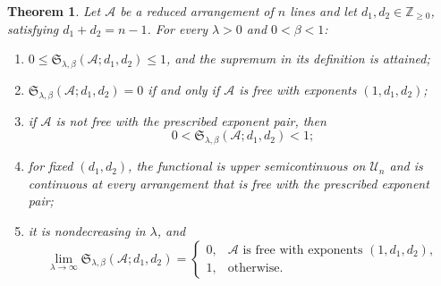 \documentclass[10pt,a4paper]{amsart}
\newtheorem{theorem}{Theorem}
\begin{document}
\begin{theorem}
\label{thm:penalised-saito}
Let $\mathcal{A}$ be a reduced arrangement of $n$ lines and let $d_1,d_2 \in \mathbb{Z}_{\geq0}$, satisfying $d_1+d_2=n-1$. For every $\lambda>0$ and $0<\beta<1$:
\begin{enumerate}[label=(\arabic*)]
\item $0\leq\mathfrak S_{\lambda,\beta}(\mathcal{A};d_1,d_2)\leq1$, and the supremum in its definition is attained;
\item $\mathfrak S_{\lambda,\beta}(\mathcal{A};d_1,d_2)=0$ if and only if $\mathcal{A}$ is free with exponents $(1,d_1,d_2)$;
\item if $\mathcal{A}$ is not free with the prescribed exponent pair, then
\[
0<\mathfrak S_{\lambda,\beta}(\mathcal{A};d_1,d_2)<1;
\]
\item for fixed $(d_1,d_2)$, the functional is upper semicontinuous on $\mathcal U_n$ and is continuous at every arrangement that is free with the prescribed exponent pair;
\item it is nondecreasing in $\lambda$, and
\[
\lim_{\lambda\to\infty}
\mathfrak S_{\lambda,\beta}(\mathcal{A};d_1,d_2)
=
\begin{cases}
0,&\mathcal{A}\text{ is free with exponents }(1,d_1,d_2),\\
1,&\text{otherwise}.
\end{cases}
\]
\end{enumerate}
\end{theorem}
\end{document}
